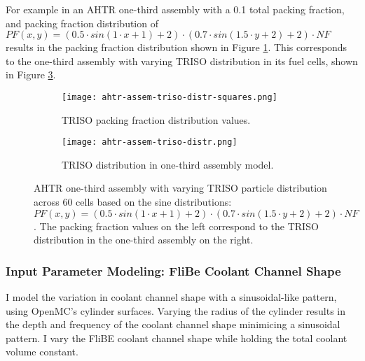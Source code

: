 For example in an \gls{AHTR} one-third assembly with a 0.1 total packing fraction, and packing 
fraction distribution of $PF(x, y) = \left(0.5\cdot sin(1\cdot x + 1) + 2\right) \cdot 
\left(0.7\cdot sin(1.5\cdot y + 2) + 2\right) \cdot NF$ results in the packing fraction 
distribution shown in Figure \ref{fig:ahtr-assem-triso-distr-squares}.
This corresponds to the one-third assembly with varying TRISO distribution in its fuel 
cells, shown in Figure \ref{fig:ahtr-assem-triso-distr}. 
\begin{figure}[htbp]
    \centering
    \begin{subfigure}{0.49\textwidth}
        \texttt{[image: ahtr-assem-triso-distr-squares.png]}
        \caption{TRISO packing fraction distribution values.}
        \label{fig:ahtr-assem-triso-distr-squares} 
    \end{subfigure}
    \begin{subfigure}{0.49\textwidth}
        \texttt{[image: ahtr-assem-triso-distr.png]}
        \raggedleft
        \caption{TRISO distribution in one-third assembly model.}
        \label{fig:ahtr-assem-triso-distr} 
    \end{subfigure}
    \caption{\acrfull{AHTR} one-third assembly with varying \gls{TRISO} particle 
        distribution across 60 cells based on the sine distributions: $PF(x, y) = 
        \left(0.5\cdot sin(1\cdot x + 1) + 2\right) \cdot 
        \left(0.7\cdot sin(1.5\cdot y + 2) + 2\right) \cdot NF$. 
        The packing fraction values on the left correspond to the TRISO 
        distribution in the one-third assembly on the right.}
\end{figure}

\subsubsection{Input Parameter Modeling: FliBe Coolant Channel Shape}
I model the variation in coolant channel shape with a sinusoidal-like pattern, 
using OpenMC's cylinder surfaces.
Varying the radius of the cylinder results in the depth and frequency of the coolant 
channel shape minimicing a sinusoidal pattern.
I vary the FliBE coolant channel shape while holding the total coolant volume constant. 

